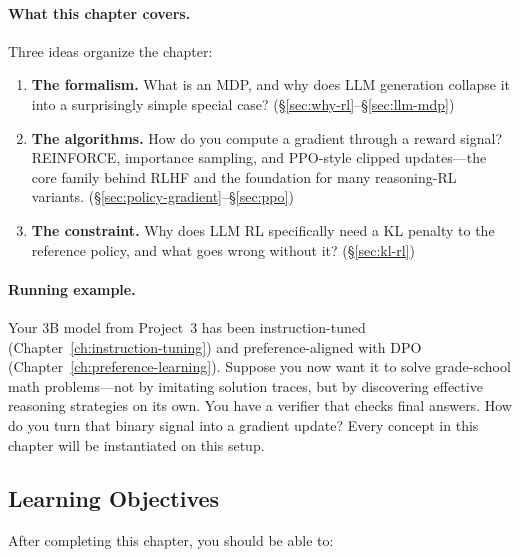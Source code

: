 \paragraph{What this chapter covers.} Three ideas organize the chapter:

\begin{enumerate}[nosep]
  \item \textbf{The formalism.} What is an MDP, and why does LLM generation collapse it into a surprisingly simple special case? (\S\ref{sec:why-rl}--\S\ref{sec:llm-mdp})
  \item \textbf{The algorithms.} How do you compute a gradient through a reward signal? REINFORCE, importance sampling, and PPO-style clipped updates---the core family behind RLHF and the foundation for many reasoning-RL variants. (\S\ref{sec:policy-gradient}--\S\ref{sec:ppo})
  \item \textbf{The constraint.} Why does LLM RL specifically need a KL penalty to the reference policy, and what goes wrong without it? (\S\ref{sec:kl-rl})
\end{enumerate}

\paragraph{Running example.} Your 3B model from Project~3 has been instruction-tuned (Chapter~\ref{ch:instruction-tuning}) and preference-aligned with DPO (Chapter~\ref{ch:preference-learning}). Suppose you now want it to solve grade-school math problems---not by imitating solution traces, but by discovering effective reasoning strategies on its own. You have a verifier that checks final answers. How do you turn that binary signal into a gradient update? Every concept in this chapter will be instantiated on this setup.


\subsection*{Learning Objectives}

After completing this chapter, you should be able to:

